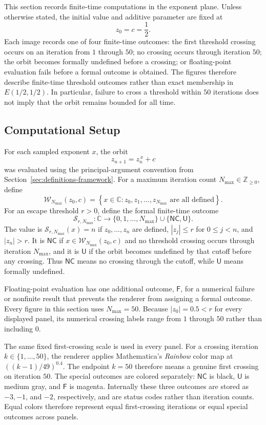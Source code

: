 \documentclass[12pt,a4paper]{amsart}
\theoremstyle{remark}
\newcommand{\C}{\mathbb{C}}
\newcommand{\Z}{\mathbb{Z}}
\begin{document}
This section records finite-time computations in the exponent plane. Unless
otherwise stated, the initial value and additive parameter are fixed at
\[
z_0=c=\frac12.
\]
Each image records one of four finite-time outcomes: the first threshold
crossing occurs on an iteration from $1$ through $50$; no crossing occurs
through iteration $50$; the orbit becomes formally undefined before a
crossing; or floating-point evaluation fails before a formal outcome is
obtained. The figures therefore describe finite-time threshold outcomes rather
than exact membership in $E(1/2,1/2)$. In particular, failure to cross a
threshold within $50$ iterations does not imply that the orbit remains bounded
for all time.

\subsection{Computational Setup}

For each sampled exponent $x$, the orbit
\[
z_{n+1}=z_n^{\,x}+c
\]
was evaluated using the principal-argument convention from
Section~\ref{sec:definitions-framework}. For a maximum iteration count
$N_{\max}\in\Z_{\ge0}$, define
\[
\mathcal{W}_{N_{\max}}(z_0,c)
=
\left\{
x\in\C:
z_0,z_1,\ldots,z_{N_{\max}}
\text{ are all defined}
\right\}.
\]
For an escape threshold $r>0$, define the formal finite-time outcome
\[
\mathcal{S}_{r,N_{\max}}
:
\C\longrightarrow
\{0,1,\ldots,N_{\max}\}\cup\{\mathsf{NC},\mathsf{U}\}.
\]
The value is $\mathcal{S}_{r,N_{\max}}(x)=n$ if $z_0,\ldots,z_n$ are
defined, $|z_j|\le r$ for $0\le j<n$, and $|z_n|>r$. It is
$\mathsf{NC}$ if $x\in\mathcal{W}_{N_{\max}}(z_0,c)$ and no
threshold crossing occurs through iteration $N_{\max}$, and it is
$\mathsf{U}$ if the orbit becomes undefined by that cutoff before any
crossing. Thus $\mathsf{NC}$ means no crossing through the cutoff, while
$\mathsf{U}$ means formally undefined.

Floating-point evaluation has one additional outcome, $\mathsf{F}$, for a
numerical failure or nonfinite result that prevents the renderer from assigning
a formal outcome. Every figure in this section uses $N_{\max}=50$. Because
$|z_0|=0.5<r$ for every displayed panel, its numerical crossing labels range
from $1$ through $50$ rather than including $0$.

The same fixed first-crossing scale is used in every panel. For a crossing
iteration $k\in\{1,\ldots,50\}$, the renderer applies Mathematica's
\emph{Rainbow} color map at $((k-1)/49)^{0.4}$. The endpoint $k=50$ therefore
means a genuine first crossing on iteration $50$. The special outcomes are
colored separately: $\mathsf{NC}$ is black, $\mathsf{U}$ is medium gray,
and $\mathsf{F}$ is magenta. Internally these three outcomes are stored as
$-3,-1$, and $-2$, respectively, and are status codes rather than iteration
counts. Equal colors therefore represent equal first-crossing iterations or
equal special outcomes across panels.
\end{document}
